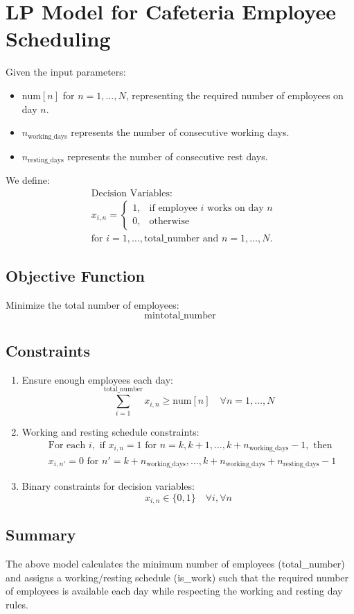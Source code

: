\documentclass{article}
\begin{document}
\section*{LP Model for Cafeteria Employee Scheduling}

Given the input parameters:
\begin{itemize}
    \item \( \text{num}[n] \) for \( n = 1, \ldots, N \), representing the required number of employees on day \( n \).
    \item \( n_{\text{working\_days}} \) represents the number of consecutive working days.
    \item \( n_{\text{resting\_days}} \) represents the number of consecutive rest days.
\end{itemize}

We define:
\begin{align*}
    & \text{Decision Variables:} \\
    & x_{i,n} = 
    \begin{cases} 
    1, & \text{if employee } i \text{ works on day } n \\
    0, & \text{otherwise}
    \end{cases} \\
    & \text{for } i = 1, \ldots, \text{total\_number} \text{ and } n = 1, \ldots, N.
\end{align*}

\subsection*{Objective Function}

Minimize the total number of employees:
\[
\min \text{total\_number}
\]

\subsection*{Constraints}

\begin{enumerate}
    \item Ensure enough employees each day:
    \[
    \sum_{i=1}^{\text{total\_number}} x_{i,n} \geq \text{num}[n] \quad \forall n = 1, \ldots, N
    \]
    
    \item Working and resting schedule constraints:
    \begin{align*}
    & \text{For each } i, \text{ if } x_{i,n} = 1 \text{ for } n = k, k+1, \ldots, k + n_{\text{working\_days}} - 1, \text{ then } \\
    & x_{i,n'} = 0 \text{ for } n' = k + n_{\text{working\_days}}, \ldots, k + n_{\text{working\_days}} + n_{\text{resting\_days}} - 1
    \end{align*}

    \item Binary constraints for decision variables:
    \[
    x_{i,n} \in \{0, 1\} \quad \forall i, \forall n
    \]
\end{enumerate}

\subsection*{Summary}

The above model calculates the minimum number of employees (total\_number) and assigns a working/resting schedule (is\_work) such that the required number of employees is available each day while respecting the working and resting day rules.
\end{document}

